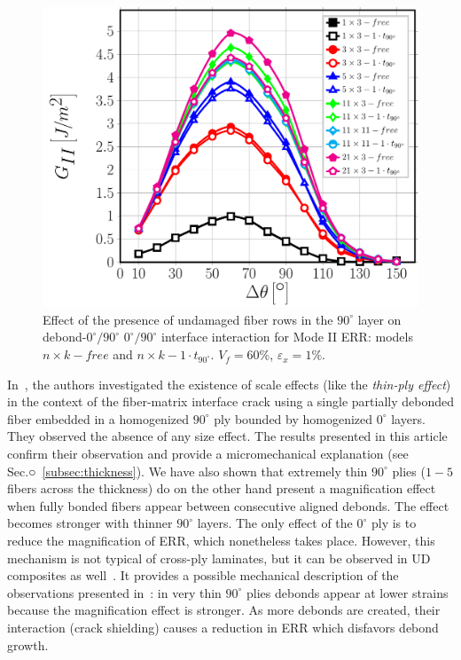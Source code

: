 \documentclass[review]{elsarticle}
\begin{document}
\begin{figure}[!h]
\centering
\includegraphics[width=\textwidth]{nxk-1-vf60-GII.pdf}
\caption{Effect of the presence of undamaged fiber rows in the $90^{\circ}$ layer on debond-$0^{\circ}/90^{\circ}$ $0^{\circ}/90^{\circ}$ interface interaction for Mode II ERR: models $n\times k-free$ and $n\times k-1\cdot t_{90^{\circ}}$. $V_{f}=60\%$, $\varepsilon_{x}=1\%$.}\label{fig:nkGII}
\end{figure}

In~\cite{Velasco2018, Paris2018}, the authors investigated the existence of scale effects (like the \emph{thin-ply effect}) in the context of the fiber-matrix interface crack using a single partially debonded fiber embedded in a homogenized $90^{\circ}$ ply bounded by homogenized $0^{\circ}$ layers. They observed the absence of any size effect. The results presented in this article confirm their observation and provide a micromechanical explanation (see Sec.○~\ref{subsec:thickness}). We have also shown that extremely thin $90^{\circ}$ plies ($1-5$ fibers across the thickness) do on the other hand present a magnification effect when fully bonded fibers appear between consecutive aligned debonds. The effect becomes stronger with thinner $90^{\circ}$ layers. The only effect of the $0^{\circ}$ ply is to reduce the magnification of ERR, which nonetheless takes place. However, this mechanism is not typical of cross-ply laminates, but it can be observed in UD composites as well~\cite{DiStasio2019}. It provides a possible mechanical description of the observations presented in~\cite{Saito2012}: in very thin $90^{\circ}$ plies debonds appear at lower strains because the magnification effect is stronger. As more debonds are created, their interaction (crack shielding) causes a reduction in ERR which disfavors debond growth.
\end{document}
